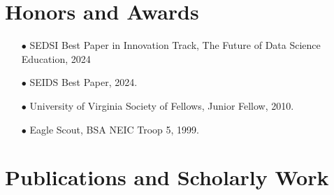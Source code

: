 \documentclass{article}[10pt]
\begin{document}
\section*{Honors and Awards}
\begin{itemize}
\item [$\bullet$] SEDSI Best Paper in Innovation Track, The Future of Data Science Education, 2024
\item [$\bullet$] SEIDS Best Paper, 2024.
\item [$\bullet$] University of Virginia Society of Fellows, Junior Fellow, 2010.
\item [$\bullet$] Eagle Scout, BSA NEIC Troop 5, 1999.
\end{itemize}


\section*{Publications and Scholarly Work}
\end{document}
